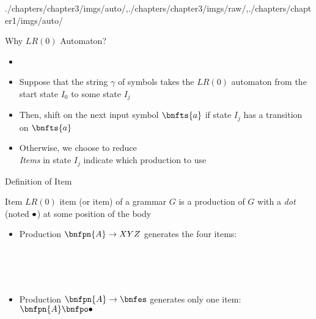 \begin{graphicspathcontext}{{./chapters/chapter3/imgs/auto/},{./chapters/chapter3/imgs/raw/},{./chapters/chapter1/imgs/auto/}}
\begin{bibunit}[apalike]
\begin{frame}[background=6]{Why $LR(0)$ Automaton?}
	\begin{itemize}
	\item {}
	\vfill
	\item Suppose that the string $\gamma$ of symbols takes the $LR(0)$ automaton from the start state $I_0$ to some state $I_j$
	\vfill
	\item Then, shift on the next input symbol $\bnfts{a}$ if state $I_j$ has a transition on $\bnfts{a}$
	\vfill
	\item Otherwise, we choose to reduce \\
		\emph{Items} in state $I_j$ indicate which production to use
	\end{itemize}
\end{frame}

\begin{frame}[t]{Definition of Item}
	\vspace{.25cm}
	\begin{definitionblock}{Item}
		$LR(0)$ item (or item) of a grammar $G$ is a production of $G$ with a \emph{dot} (noted $\bullet$) at some position of the body
	\end{definitionblock}
	\begin{itemize}
	\item Production $\bnfpn{A} \bnfopo XYZ$ generates the four items:
		\begin{footnotesize}\begin{minipage}[t]{.35\linewidth}\vspace{-.6cm}\begin{bnf}
			 \\
			 \\
			 \\
		\end{bnf}\end{minipage}\end{footnotesize}
	\item Production $\bnfpn{A} \bnfopo \bnfes$ generates only one item: $\bnfpn{A} \bnfpo \bnfindex$
	\end{itemize}
\end{frame}


\end{bibunit}
\end{graphicspathcontext}

